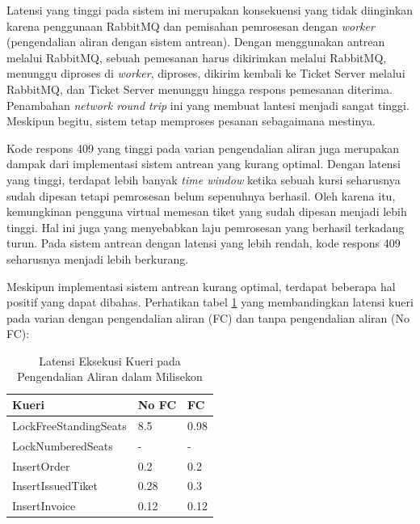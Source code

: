 Latensi yang tinggi pada sistem ini merupakan konsekuensi yang tidak diinginkan karena penggunaan RabbitMQ dan pemisahan pemrosesan dengan \textit{worker} (pengendalian aliran dengan sistem antrean). Dengan menggunakan antrean melalui RabbitMQ, sebuah pemesanan harus dikirimkan melalui RabbitMQ, menunggu diproses di \textit{worker}, diproses, dikirim kembali ke Ticket Server melalui RabbitMQ, dan Ticket Server menunggu hingga respons pemesanan diterima. Penambahan \textit{network round trip} ini yang membuat lantesi menjadi sangat tinggi. Meskipun begitu, sistem tetap memproses pesanan sebagaimana mestinya.

Kode respons 409 yang tinggi pada varian pengendalian aliran juga merupakan dampak dari implementasi sistem antrean yang kurang optimal. Dengan latensi yang tinggi, terdapat lebih banyak \textit{time window} ketika sebuah kursi seharusnya sudah dipesan tetapi pemrosesan belum sepenuhnya berhasil. Oleh karena itu, kemungkinan pengguna virtual memesan tiket yang sudah dipesan menjadi lebih tinggi. Hal ini juga yang menyebabkan laju pemrosesan yang berhasil terkadang turun. Pada sistem antrean dengan latensi yang lebih rendah, kode respons 409 seharusnya menjadi lebih berkurang.

Meskipun implementasi sistem antrean kurang optimal, terdapat beberapa hal positif yang dapat dibahas. Perhatikan tabel \ref{table:latensi-kueri-fc-nofc} yang membandingkan latensi kueri pada varian dengan pengendalian aliran (FC) dan tanpa pengendalian aliran (No FC):

\begin{table}[h]
    \centering
    \caption{Latensi Eksekusi Kueri pada Pengendalian Aliran dalam Milisekon}
    \label{table:latensi-kueri-fc-nofc}
    \begin{tabular}{|l|l|l|}
        \hline
        \textbf{Kueri}        & \textbf{No FC} & \textbf{FC} \\
        \hline
        LockFreeStandingSeats & 8.5            & 0.98        \\
        \hline
        LockNumberedSeats     & -              & -           \\
        \hline
        InsertOrder           & 0.2            & 0.2         \\
        \hline
        InsertIssuedTiket     & 0.28           & 0.3         \\
        \hline
        InsertInvoice         & 0.12           & 0.12        \\
        \hline
    \end{tabular}
\end{table}

